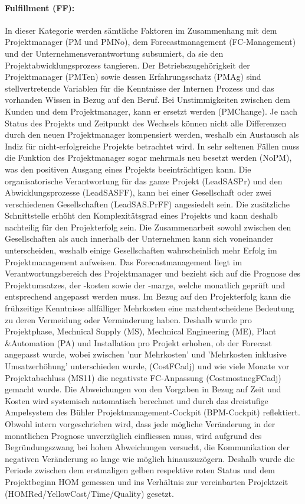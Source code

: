 \paragraph{Fulfillment (FF): } In dieser Kategorie werden sämtliche Faktoren im Zusammenhang mit dem Projektmanager (PM und PMNo), dem Forecastmanagement (FC-Management) und der Unternehmensverantwortung subsumiert, da sie den Projektabwicklungsprozess tangieren. Der Betriebszugehörigkeit der Projektmanager (PMTen) sowie dessen Erfahrungsschatz (PMAg) sind stellvertretende Variablen für die Kenntnisse der Internen Prozess und das vorhanden Wissen in Bezug auf den Beruf. Bei Unstimmigkeiten zwischen dem Kunden und dem Projektmanager, kann er ersetzt werden (PMChange). Je nach Status des Projekts und Zeitpunkt des Wechsels können nicht alle Differenzen durch den neuen Projektmanager kompensiert werden, weshalb ein Austausch als Indiz für nicht-erfolgreiche Projekte betrachtet wird. In sehr seltenen Fällen muss die Funktion des Projektmanager sogar mehrmals neu besetzt werden (NoPM), was den positiven Ausgang eines Projekts beeinträchtigen kann.
\newline Die organisatorische Verantwortung für das ganze Projekt (LeadSASPr) und den Abwicklungsprozesse (LeadSASFF), kann bei einer Gesellschaft oder zwei verschiedenen Gesellschaften (LeadSAS.PrFF) angesiedelt sein. Die zusätzliche Schnittstelle erhöht den Komplexitätsgrad eines Projekts und kann deshalb nachteilig für den Projekterfolg sein. Die Zusammenarbeit sowohl zwischen den Gesellschaften als auch innerhalb der Unternehmen kann sich voneinander unterscheiden, weshalb einige Gesellschaften wahrscheinlich mehr Erfolg im Projektmanagement aufweisen.
\newline Das  Forecastmanagement liegt im Verantwortungsbereich des Projektmanager und bezieht sich auf die Prognose des Projektumsatzes, der -kosten sowie der -marge, welche monatlich geprüft und entsprechend angepasst werden muss. Im Bezug auf den Projekterfolg kann die frühzeitige Kenntnisse allfälliger Mehrkosten eine matchentscheidene Bedeutung zu deren Vermeidung oder Verminderung haben. Deshalb wurde pro Projektphase, Mechnical Supply (MS), Mechnical Engineering (ME), Plant \&Automation (PA) und Installation pro Projekt erhoben, ob der Forecast angepasst wurde, wobei zwischen 'nur Mehrkosten' und 'Mehrkosten inklusive Umsatzerhöhung' unterschieden wurde, (CostFCadj) und wie viele Monate vor Projektabschluss (MS11) die negativste FC-Anpassung (CostmostnegFCadj) gemacht wurde. Die Abweichungen von den Vorgaben in Bezug auf Zeit und Kosten wird systemisch automatisch berechnet und  durch das dreistufige Ampelsystem des Bühler Projektmanagement-Cockpit (BPM-Cockpit) reflektiert. Obwohl intern vorgeschrieben wird, dass jede mögliche Veränderung in der monatlichen Prognose unverzüglich einfliessen muss, wird aufgrund des Begründungszwang bei hohen Abweichungen versucht, die Kommunikation der negativen Veränderung so lange wie möglich hinauszuzögern.  %
Deshalb wurde die Periode zwischen dem erstmaligen gelben respektive roten Status und dem Projektbeginn HOM gemessen und ins Verhältnis zur vereinbarten Projektzeit (HOMRed/YellowCost/Time/Quality) gesetzt.  %
